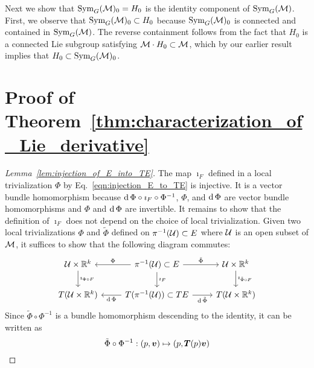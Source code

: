 \documentclass[twoside,11pt]{article}
\begin{document}
    Next we show that $\operatorname{Sym}_G({\mathcal{M}})_0 = H_0$ is the identity component of $\operatorname{Sym}_G({\mathcal{M}})$.
    First, we observe that $\operatorname{Sym}_G({\mathcal{M}})_0 \subset H_0$ because $\operatorname{Sym}_G({\mathcal{M}})_0$ is connected and contained in $\operatorname{Sym}_G({\mathcal{M}})$.
    The reverse containment follows from the fact that $H_0$ is a connected Lie subgroup satisfying ${\mathcal{M}}\cdot H_0 \subset {\mathcal{M}}$, which by our earlier result implies that $H_0 \subset \operatorname{Sym}_G({\mathcal{M}})_0$.
\hfill\qedsymbol

\section{Proof of Theorem~\ref{thm:characterization_of_Lie_derivative}}
\label{app:characterization_of_Lie_derivative}
\begin{proof}[Lemma~\ref{lem:injection_of_E_into_TE}]
    The map $\imath_F$ defined in a local trivialization $\Phi$ by Eq.~\ref{eqn:injection_E_to_TE} is injective.
    It is a vector bundle homomorphism because $\operatorname{\mathrm{d}}\Phi \circ \imath_F \circ \Phi^{-1}$, $\Phi$, and $\operatorname{\mathrm{d}} \Phi$ are vector bundle homomorphisms and $\Phi$ and $\operatorname{\mathrm{d}} \Phi$ are invertible.
    It remains to show that the definition of $\imath_F$ does not depend on the choice of local trivialization.
    Given two local trivializations $\Phi$ and $\tilde{\Phi}$ defined on $\pi^{-1}({\mathcal{U}}) \subset E$ where ${\mathcal{U}}$ is an open subset of ${\mathcal{M}}$, it suffices to show that the following diagram commutes:
    \begin{equation}
        \begin{tikzcd}
	       {\mcal{U}\times\R^k} & {\pi^{-1}(\mcal{U})\subset E} & {\mcal{U}\times\R^k} \\
	       {T(\mcal{U}\times\R^k)} & {T(\pi^{-1}(\mcal{U}))\subset TE} & {T(\mcal{U}\times\R^k)}
	       \arrow["{\imath_F}", from=1-2, to=2-2]
	       \arrow["{\imath_{\Phi\circ F}}", from=1-1, to=2-1]
	       \arrow["{\imath_{\tilde{\Phi}\circ F}}", from=1-3, to=2-3]
	       \arrow["\Phi"', from=1-2, to=1-1]
	       \arrow["{\D\Phi}", from=2-2, to=2-1]
	       \arrow["{\tilde{\Phi}}", from=1-2, to=1-3]
	       \arrow["{\D\tilde{\Phi}}"', from=2-2, to=2-3]
        \end{tikzcd}
    \end{equation}
    Since $\tilde{\Phi} \circ \Phi^{-1}$ is a bundle homomorphism descending to the identity, it can be written as
    \begin{equation}
        \tilde{\Phi} \circ \Phi^{-1}: (p,{\boldsymbol{v}}) \mapsto (p, {\pmb{T}}(p) {\boldsymbol{v}})
    \end{equation}

\end{proof}
\end{document}
